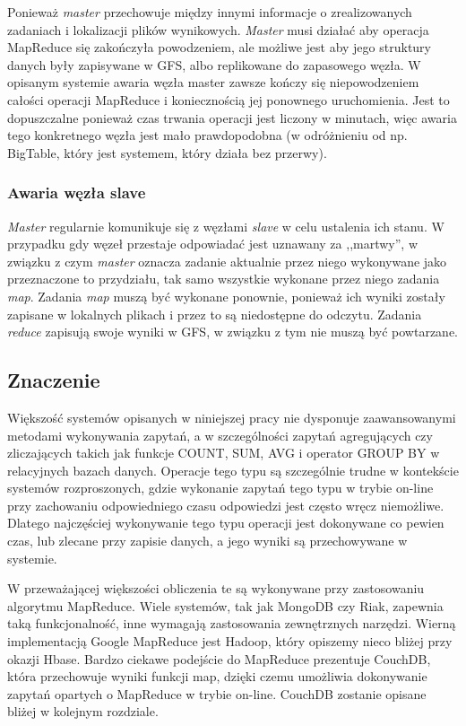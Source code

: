 Ponieważ \emph{master} przechowuje między innymi informacje o zrealizowanych zadaniach i lokalizacji plików wynikowych.
\emph{Master} musi działać aby operacja MapReduce się zakończyła powodzeniem, ale możliwe jest aby jego struktury danych były zapisywane w GFS, albo replikowane do zapasowego węzła.
W opisanym systemie awaria węzła master zawsze kończy się niepowodzeniem całości operacji MapReduce i koniecznością jej ponownego uruchomienia.
Jest to dopuszczalne ponieważ czas trwania operacji jest liczony w minutach, więc awaria tego konkretnego węzła jest mało prawdopodobna (w odróżnieniu od np. BigTable, który jest systemem, który działa bez przerwy).

\subsubsection*{Awaria węzła slave}

\emph{Master} regularnie komunikuje się z węzłami \emph{slave} w celu ustalenia ich stanu.
W przypadku gdy węzeł przestaje odpowiadać jest uznawany za ,,martwy'', w związku z czym \emph{master} oznacza zadanie aktualnie przez niego wykonywane jako przeznaczone to przydziału, tak samo wszystkie wykonane przez niego zadania \emph{map}.
Zadania \emph{map} muszą być wykonane ponownie, ponieważ ich wyniki zostały zapisane w lokalnych plikach i przez to są niedostępne do odczytu.
Zadania \emph{reduce} zapisują swoje wyniki w GFS, w związku z tym nie muszą być powtarzane. 

\subsection*{Znaczenie}

Większość systemów opisanych w niniejszej pracy nie dysponuje zaawansowanymi metodami wykonywania zapytań, a w szczególności zapytań agregujących czy zliczających takich jak funkcje COUNT, SUM, AVG i operator GROUP BY w relacyjnych bazach danych.
Operacje tego typu są szczególnie trudne w kontekście systemów rozproszonych, gdzie wykonanie zapytań tego typu w trybie on-line przy zachowaniu odpowiedniego czasu odpowiedzi jest często wręcz niemożliwe.
Dlatego najczęściej wykonywanie tego typu operacji jest dokonywane co pewien czas, lub zlecane przy zapisie danych, a jego wyniki są przechowywane w systemie.

W przeważającej większości obliczenia te są wykonywane przy zastosowaniu algorytmu MapReduce.
Wiele systemów, tak jak MongoDB czy Riak, zapewnia taką funkcjonalność, inne wymagają zastosowania zewnętrznych narzędzi.
Wierną implementacją Google MapReduce jest Hadoop, który opiszemy nieco bliżej przy okazji Hbase.
Bardzo ciekawe podejście do MapReduce prezentuje CouchDB, która przechowuje wyniki funkcji map, dzięki czemu umożliwia dokonywanie zapytań opartych o MapReduce w trybie on-line.
CouchDB zostanie opisane bliżej w kolejnym rozdziale.

